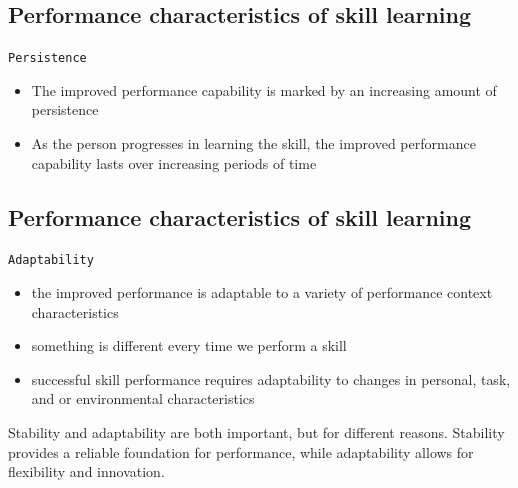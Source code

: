 \documentclass[
  letterpaper,
  DIV=11,
  numbers=noendperiod]{scrartcl}
\providecommand{\tightlist}{%
  \setlength{\itemsep}{0pt}\setlength{\parskip}{0pt}}\usepackage{longtable,booktabs,array}
\begin{document}
\hypertarget{performance-characteristics-of-skill-learning-3}{%
\subsection{Performance characteristics of skill
learning}\label{performance-characteristics-of-skill-learning-3}}

\texttt{Persistence}

\begin{itemize}
\tightlist
\item
  The improved performance capability is marked by an increasing amount
  of persistence
\item
  As the person progresses in learning the skill, the improved
  performance capability lasts over increasing periods of time
\end{itemize}

\hypertarget{performance-characteristics-of-skill-learning-4}{%
\subsection{Performance characteristics of skill
learning}\label{performance-characteristics-of-skill-learning-4}}

\texttt{Adaptability}

\begin{itemize}
\tightlist
\item
  the improved performance is adaptable to a variety of performance
  context characteristics
\item
  something is different every time we perform a skill
\item
  successful skill performance requires adaptability to changes in
  personal, task, and or environmental characteristics
\end{itemize}

\begin{tcolorbox}[enhanced jigsaw, opacitybacktitle=0.6, coltitle=black, colbacktitle=quarto-callout-note-color!10!white, bottomtitle=1mm, arc=.35mm, colframe=quarto-callout-note-color-frame, left=2mm, bottomrule=.15mm, toprule=.15mm, toptitle=1mm, breakable, opacityback=0, titlerule=0mm, title=\textcolor{quarto-callout-note-color}{\faInfo}\hspace{0.5em}{Note}, rightrule=.15mm, leftrule=.75mm, colback=white]

Stability and adaptability are both important, but for different
reasons. Stability provides a reliable foundation for performance, while
adaptability allows for flexibility and innovation.

\end{tcolorbox}
\end{document}
